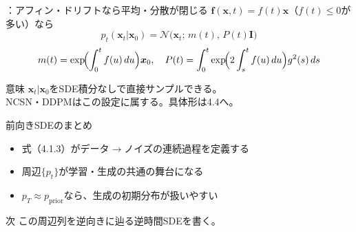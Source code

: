 \assuppl
\begin{frame}{\supplmark：アフィン・ドリフトなら平均・分散が閉じる}
    $\bm{f}(\bm{x},t)=f(t)\bm{x}$（$f(t)\le 0$が多い）なら
    \[
        p_t(\bm{x}_t|\bm{x}_0)
        =
        \mathcal{N}\bigl(\bm{x}_t;\,m(t),\,P(t)\bm{I}\bigr)
    \]
    \[
        m(t)=\exp\!\Bigl(\int_0^t f(u)\,du\Bigr)\bm{x}_0,
        \quad
        P(t)=\int_0^t
        \exp\!\Bigl(2\int_s^t f(u)\,du\Bigr)g^{2}(s)\,ds
    \]
    \begin{exampleblock}{意味}
        $\bm{x}_t|\bm{x}_0$をSDE積分なしで直接サンプルできる。\\
        NCSN・DDPMはこの設定に属する。具体形は4.4へ。
    \end{exampleblock}
\end{frame}
\asmain
\begin{frame}{前向きSDEのまとめ}
    \begin{itemize}
        \item 式（4.1.3）がデータ$\to$ノイズの連続過程を定義する
        \item 周辺$\{p_t\}$が学習・生成の共通の舞台になる
        \item $p_T\approx p_{\mathrm{prior}}$なら、生成の初期分布が扱いやすい
    \end{itemize}
    \begin{block}{次}
        この周辺列を逆向きに辿る逆時間SDEを書く。
    \end{block}
\end{frame}
